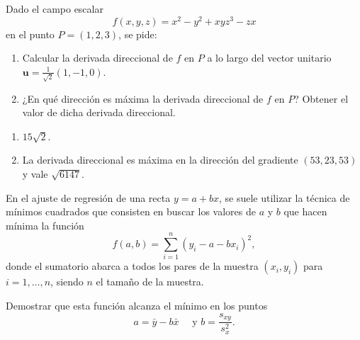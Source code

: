 {Dado el campo escalar 
\[
f(x,y,z) = x^2-y^2+xyz^3-zx
\]
en el punto $P=(1,2,3)$, se pide:
\begin{enumerate}
\item Calcular la derivada direccional de $f$ en $P$ a lo largo del vector unitario $\mathbf{u}=\frac{1}{\sqrt2}(1,-1,0)$.
\item ¿En qué dirección es máxima la derivada direccional de $f$ en $P$? Obtener el valor de dicha derivada direccional.
\end{enumerate} 
}
{\begin{enumerate}
\item $15\sqrt{2}$.
\item La derivada direccional es máxima en la dirección del gradiente $(53,23,53)$ y vale $\sqrt{6147}$.
\end{enumerate}
}
{
}


{En el ajuste de regresión de una recta $y=a+bx$, se suele utilizar la técnica de mínimos cuadrados que consisten en buscar los valores
de $a$ y $b$ que hacen mínima la función
\[
f(a,b)= \sum_{i=1}^{n}(y_i-a-bx_i)^2,
\]
donde el sumatorio abarca a todos los pares de la muestra $(x_i,y_i)$ para $i=1,\ldots, n$, siendo $n$ el tamaño de la muestra.

Demostrar que esta función alcanza el mínimo en los puntos 
\[
a=\bar y-b\bar x \quad \mbox{ y } b=\frac{s_{xy}}{s_x^2}.
\]
}
{
}
{
}
